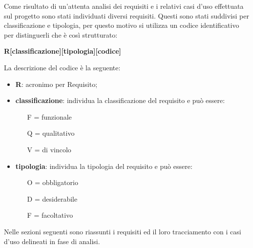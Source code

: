 Come risultato di un'attenta analisi dei requisiti e i relativi casi d'uso effettuata sul progetto sono stati individuati diversi requisiti. Questi sono stati suddivisi per classificazione e tipologia, per questo motivo si utilizza un codice identificativo per distinguerli che è così strutturato:
\begin{center}
	\textbf{R[classificazione][tipologia][codice]}
\end{center}
La descrizione del codice è la seguente:
\begin{itemize}
	\item \textbf{R}: acronimo per Requisito;
	\item \textbf{classificazione}: individua la classificazione del requisito e può essere:
	\begin{itemize}
		\item [F =] funzionale
		\item [Q =] qualitativo
		\item [V =]  di vincolo
	\end{itemize}
	\item \textbf{tipologia}: individua la tipologia del requisito e può essere:
	\begin{itemize}
		\item [O =] obbligatorio
		\item [D =] desiderabile
		\item [F =] facoltativo
	\end{itemize}
\end{itemize}

Nelle sezioni seguenti sono riassunti i requisiti ed il loro tracciamento con i casi d'uso delineati in fase di analisi.

